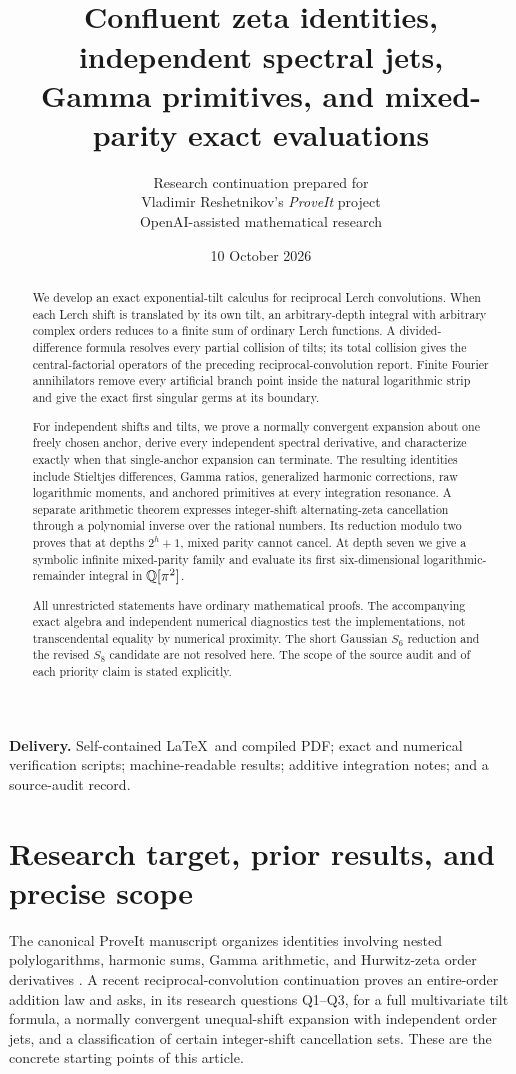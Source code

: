 \documentclass[11pt,letterpaper]{article}
\title{\vspace{-1.3cm}{\LARGE\bfseries Tilted Lerch Convolutions\\[5pt] and Binary Harmonic Cancellation}\\[12pt]
{\large Confluent zeta identities, independent spectral jets,\\ Gamma primitives, and mixed-parity exact evaluations}}
\author{Research continuation prepared for\\ Vladimir Reshetnikov's \emph{ProveIt} project\\[3pt]\small OpenAI-assisted mathematical research}
\date{10 October 2026}
\numberwithin{equation}{section}
\theoremstyle{definition}\newtheorem{definition}[theorem]{Definition}
\theoremstyle{remark}\newtheorem{remark}[theorem]{Remark}
\begin{document}
\maketitle
\thispagestyle{empty}
\begin{abstract}
We develop an exact exponential-tilt calculus for reciprocal Lerch convolutions. When each Lerch shift is translated by its own tilt, an arbitrary-depth integral with arbitrary complex orders reduces to a finite sum of ordinary Lerch functions. A divided-difference formula resolves every partial collision of tilts; its total collision gives the central-factorial operators of the preceding reciprocal-convolution report. Finite Fourier annihilators remove every artificial branch point inside the natural logarithmic strip and give the exact first singular germs at its boundary.

For independent shifts and tilts, we prove a normally convergent expansion about one freely chosen anchor, derive every independent spectral derivative, and characterize exactly when that single-anchor expansion can terminate. The resulting identities include Stieltjes differences, Gamma ratios, generalized harmonic corrections, raw logarithmic moments, and anchored primitives at every integration resonance. A separate arithmetic theorem expresses integer-shift alternating-zeta cancellation through a polynomial inverse over the rational numbers. Its reduction modulo two proves that at depths $2^h+1$, mixed parity cannot cancel. At depth seven we give a symbolic infinite mixed-parity family and evaluate its first six-dimensional logarithmic-remainder integral in $\mathbb Q[\pi^2]$.

All unrestricted statements have ordinary mathematical proofs. The accompanying exact algebra and independent numerical diagnostics test the implementations, not transcendental equality by numerical proximity. The short Gaussian $S_6$ reduction and the revised $S_8$ candidate are not resolved here. The scope of the source audit and of each priority claim is stated explicitly.
\end{abstract}
\vfill
\noindent\textbf{Delivery.} Self-contained \LaTeX\ and compiled PDF; exact and numerical verification scripts; machine-readable results; additive integration notes; and a source-audit record.
\clearpage
\tableofcontents
\clearpage

\section{Research target, prior results, and precise scope}
\label{tlbc:sec:scope}
The canonical ProveIt manuscript organizes identities involving nested polylogarithms, harmonic sums, Gamma arithmetic, and Hurwitz-zeta order derivatives \cite{Repo}. A recent reciprocal-convolution continuation \cite{RLC} proves an entire-order addition law and asks, in its research questions Q1--Q3, for a full multivariate tilt formula, a normally convergent unequal-shift expansion with independent order jets, and a classification of certain integer-shift cancellation sets. These are the concrete starting points of this article.
\end{document}
